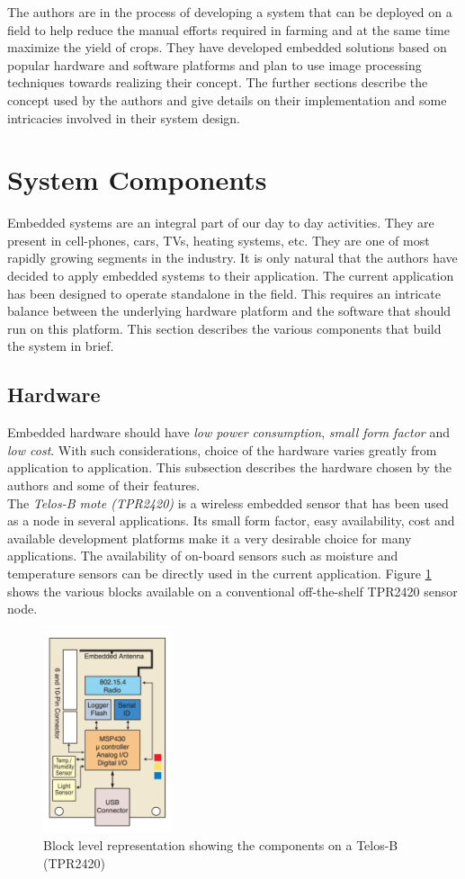 \documentclass{sig-alternate-05-2015}
\begin{document}
The authors are in the process of developing a system that can be deployed on a field to help reduce the manual efforts required in farming and at the same time maximize the yield of crops. They have developed embedded solutions based on popular hardware and software platforms and plan to use image processing techniques towards realizing their concept. The further sections describe the concept used by the authors and give details on their implementation and some intricacies involved in their system design.


\section{System Components}
Embedded systems are an integral part of our day to day activities. They are present in cell-phones, cars, TVs, heating systems, etc. They are one of most rapidly growing segments in the industry. It is only natural that the authors have decided to apply embedded systems to their application. The current application has been designed to operate standalone in the field. This requires an intricate balance between the underlying hardware platform and the software that should run on this platform. This section describes the various components that build the system in brief.\\

\subsection{Hardware}
Embedded hardware should have \textit{low power consumption}, \textit{small form factor} and \textit{low cost}. With such considerations, choice of the hardware varies greatly from application to application. This subsection describes the hardware chosen by the authors and some of their features.\\

The \textit{Telos-B mote (TPR2420)} is a wireless embedded sensor that has been used as a node in several applications. Its small form factor, easy availability, cost and available development platforms make it a very desirable choice for many applications. The availability of on-board sensors such as moisture and temperature sensors can be directly used in the current application. Figure \ref{TelosB} shows the various blocks available on a conventional off-the-shelf TPR2420 sensor node.
\begin{figure}[h]
\centering
\includegraphics[width=1.5in]{TelosB.png}
\caption{Block level representation showing the components on a Telos-B (TPR2420)}
\label{TelosB}
\end{figure}
\end{document}
